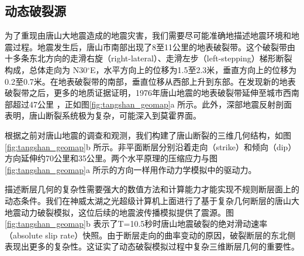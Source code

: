 \documentclass[degree=doctor]{thuthesis}
\begin{document}
\subsection{动态破裂源}

为了重现由唐山大地震造成的地震灾害，我们需要尽可能准确地描述地震环境和地震过程。地震发生后，唐山市南部出现了8至11公里的地表破裂带。这个破裂带由十多条东北方向的走滑右旋（right-lateral）、走滑左步（left-stepping）梯形断裂构成，总体走向为 N30$^\circ$E，水平方向上的位移为1.5至2.3米，垂直方向上的位移为0.2至0.7米。在地表破裂带的南部，垂直位移从西部上升到东部。在发现新的地表破裂带\citep {Qiu_discovery_2005}之后，更多的地质证据证明，1976年唐山地震的地表破裂带延伸至城市西南部超过47公里 \citep{guo_new_2011}，正如图\ref{fig:tangshan_geomap}a 所示。此外，深部地震反射剖面表明，唐山断裂系统极为复杂，可能深入到莫霍界面\citep{liu_seismogenic_2007}。

根据之前对唐山地震的调查和观测，我们构建了唐山断裂的三维几何结构，如图\ref{fig:tangshan_geomap}b 所示。非平面断层分别沿着走向（strike）和倾向（dip）方向延伸约70公里和35公里。两个水平原理的压缩应力与图\ref{fig:tangshan_geomap}a 所示的方向一样用作动力学模拟中的驱动力。

描述断层几何的复杂性需要强大的数值方法和计算能力才能实现不规则断层面上的动态条件。我们在神威太湖之光超级计算机上面进行了基于复杂几何断层的唐山大地震动力破裂模拟，这位后续的地震波传播模拟提供了震源。图 \ref{fig:tangshan_geomap}b 表示了T=10.5秒时唐山地震破裂的绝对滑动速率（absolute slip rate）快照。由于断层走向的曲率变动的原因，破裂断层的东北侧表现出更多的复杂性。这证实了动态破裂模拟过程中复杂三维断层几何的重要性。
\end{document}
